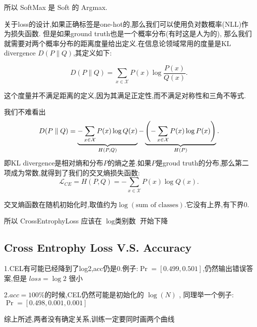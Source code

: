 所以 SoftMax 是 Soft 的 Argmax.

关于loss的设计,如果正确标签是one-hot的,那么我们可以使用负对数概率(NLL)作为损失函数.
但是如果ground truth也是一个概率分布(有时这是人为的),
那么我们就需要对两个概率分布的距离度量给出定义.在信息论领域常用的度量是KL divergence $D(P \parallel Q)$,其定义如下:

\begin{equation}
	D(P \parallel Q) = \sum_{x \in \mathcal X} P(x) \log \frac{P(x)}{Q(x)}.
\end{equation}

这个度量并不满足距离的定义,因为其满足正定性,而不满足对称性和三角不等式.

我们不难看出
\begin{equation}
	D(P \parallel Q) = \underbrace{-\sum_{x \in \mathcal X} P(x)\log Q(x)}_{H(P, Q)} - \underbrace{\left( -\sum_{x \in \mathcal X} P(x) \log P(x)\right)}_{H(P)}.
\end{equation}
即KL divergence是相对熵和分布$P$的熵之差.如果$P$是groud truth的分布,那么第二项成为常数,就得到了我们的交叉熵损失函数:
\begin{equation}
	\mathcal L_{CE} = H(P, Q) = -\sum_{x \in \mathcal X} P(x) \log Q(x).
\end{equation}

交叉熵函数在随机初始化时,取值约为$\log (\text{sum of classes})$.它没有上界,有下界$0$.

所以 CrossEntrophyLoss 应该在 $\log{\text{类别数}}$ 开始下降

\subsection{Cross Entrophy Loss V.S. Accuracy}

1.CEL有可能已经降到了log2,acc仍是0.例子:$\Pr=[0.499,0.501]$,仍然输出错误答案,但是 $loss=\log2$ 很小

2.$acc=100\%$的时候,CEL仍然可能是初始化的 $\log(N)$ , 同理举一个例子:$\Pr=[0.498,0.001,0.001]$

综上所述,两者没有确定关系,训练一定要同时画两个曲线
